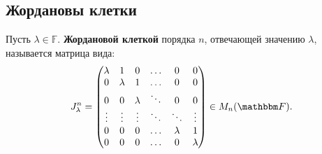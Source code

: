 \subsection{Жордановы клетки}
\begin{Def}
Пусть $\lambda \in \mathbb{F}$. \textbf{Жордановой клеткой} порядка $n$, отвечающей значению $\lambda$, называется матрица вида:
\begin{gather*}
J_\l^n = 
\begin{pmatrix}
\l & 1 & 0 & \ldots & 0 & 0 \\
0 & \l & 1 & \ldots & 0 & 0 \\
0 & 0 & \l & \ddots & 0 & 0 \\
\vdots & \vdots & \vdots & \ddots & \ddots & \vdots \\
0 & 0 & 0 & \ldots & \l & 1 \\
0 & 0 & 0 & \ldots & 0 & \l
\end{pmatrix} \in M_n(\mathbb{F}).
\end{gather*}
\end{Def}


